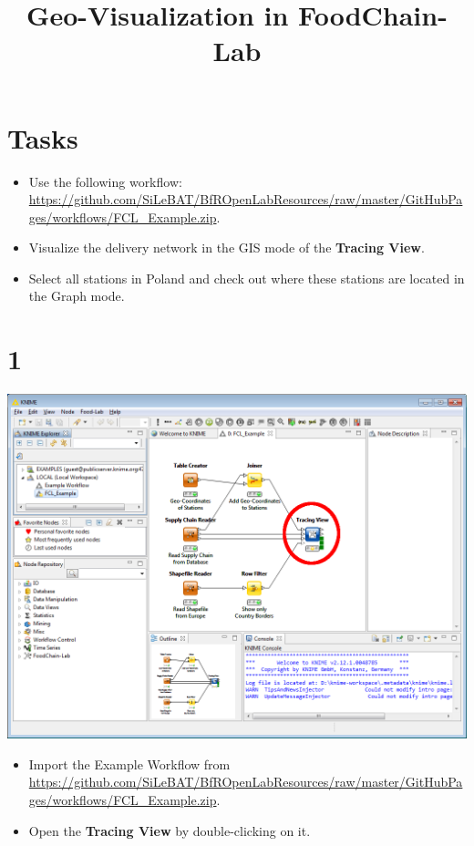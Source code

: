 \documentclass{beamer}
\title{Geo-Visualization in FoodChain-Lab}
\date{}
\begin{document}
\maketitle

\section{Tasks}
\begin{frame}
	\begin{itemize}
		\item Use the following workflow: \url{https://github.com/SiLeBAT/BfROpenLabResources/raw/master/GitHubPages/workflows/FCL_Example.zip}.
		\item Visualize the delivery network in the GIS mode of the \textbf{Tracing View}.
		\item Select all stations in Poland and check out where these stations are located in the Graph mode.
	\end{itemize}
\end{frame}
 
\section{1}
\begin{frame}
	\begin{center}
  		\includegraphics[height=0.6\textheight]{1.png}
	\end{center}
	\begin{itemize}
		\item Import the Example Workflow from \url{https://github.com/SiLeBAT/BfROpenLabResources/raw/master/GitHubPages/workflows/FCL_Example.zip}.
		\item Open the \textbf{Tracing View} by double-clicking on it.
	\end{itemize}
\end{frame}
\end{document}
